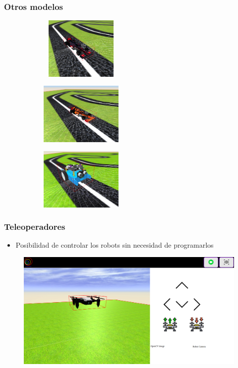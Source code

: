 \documentclass[xcolor={table}]{beamer}
\begin{document}
		\begin{frame}
			\frametitle{Otros modelos}
		\begin{figure}[H]
        \centering
        \begin{subfigure}{\textwidth}
         \includegraphics[width=4cm, height=3cm]{img/f1_williams.png}
 \label{fig:f1williams}
        \end{subfigure}
        \begin{subfigure}{\textwidth}
         \includegraphics[width=4cm, height=3cm]{img/f1_renault.png}
   \label{fig:f1renault}
        \end{subfigure}
        \begin{subfigure}{\textwidth}
         \includegraphics[width=4cm, height=3cm]{img/mBot_model.png}
   \label{fig:mbot}
        \end{subfigure}
        \end{figure}
		\end{frame}
		
		\begin{frame}
		\frametitle{Teleoperadores}
    		\begin{itemize}
    			\item Posibilidad de controlar los robots sin necesidad de programarlos
		    \end{itemize}
    		\begin{figure}{\textwidth}
    		\centering
             \includegraphics[scale=0.18]{img/drone_teleoperator.png}
             \label{fig:teleopdrone}
            \end{figure}
		\end{frame}
		
\end{document}
